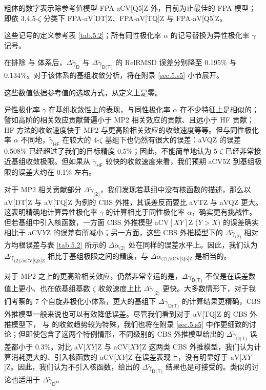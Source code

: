 \begin{table}[ht]
    \raggedright
    \par{} 粗体的数字表示除参考值模型 FPA-aCV[Q5]Z 外，目前为止最佳的 FPA 模型；即依 3,4,5-$\zeta$ 分类下 FPA-aV[DT]Z、FPA-aV[TQ]Z 与 FPA-aV[Q5]Z。
    \par{} 这些记号的定义参考表 \ref{tab.5.2}；所有同性极化率 $\alpha$ 的记号替换为异性极化率 $\gamma$ 记号。
    \par{} 在排除  与  体系后，$\Delta \tilde \gamma_\textsf{D}$ 与 $\Delta \tilde \gamma_\textsf{D(T)}$ 的 RelRMSD 误差分别降至 0.195\% 与 0.134\%。对于该体系的基组收敛分析，将在附录 \ref{sec.5.s5} 小节展开。
    \par{} 这些数值依据参考值的选取方式，从定义上是零。
\end{table}

异性极化率 $\gamma$ 在基组收敛性上的表现，与同性极化率 $\alpha$ 在不少特征上是相似的；譬如高阶的相关效应贡献普遍小于 MP2 相关效应的贡献、且远小于 HF 贡献；HF 方法的收敛速度快于 MP2 与更高阶相关效应的收敛速度等等。但与同性极化率 $\alpha$ 不同地，$\tilde \gamma_\textsf{HF}$ 在较大的 4-$\zeta$ 基组下也仍然有很大的误差：aVQZ 的误差 0.508\% 已经超过了我们的目标精度 0.5\%；因此，不能简单地认为 5-$\zeta$ 已经非常接近基组收敛极限。但如果从 $\tilde \gamma_\textsf{HF}$ 较快的收敛速度来看，我们预期 aCV5Z 到基组极限的误差大约在 0.1\% 左右。

对于 MP2 相关贡献部分 $\Delta \tilde \gamma_\textsf{(2)}$，我们发现若基组中没有核函数的描述，那么以 aV[DT]Z 与 aV[TQ]Z 为例的 CBS 外推，其误差反而要比 aVTZ 与 aVQZ 更大。这表明精确地计算异性极化率 $\gamma$ 的计算相比于同性极化率 $\alpha$，确实更有挑战性。但若基组中引入核函数，一方面 CBS 外推模型 aCV$[XY]$Z ($Y > X$) 的误差确实相比于 aCV$Y$Z 的误差有所减小；另一方面，这些 CBS 外推模型下的 $\Delta \tilde \gamma_\textsf{(2)}$ 相对方均根误差与表 \ref{tab.5.2} 所示的 $\Delta \tilde \alpha_\textsf{(2)}$ 处在同样的误差水平上。因此，我们认为 $\Delta \tilde \gamma_{\textsf{(2)}/\text{aCV[Q5]Z}}$ 相比于基组极限之间的精度，与 $\Delta \tilde \alpha_{\textsf{(2)}/\text{aCV[Q5]Z}}$ 是相当的。

对于 MP2 之上的更高阶相关效应，仍然非常幸运的是，$\Delta \tilde \gamma_\textsf{D(T)}$ 不仅是在误差数值上更小、也在依基组基数 $\zeta$ 收敛速度上比 $\Delta \tilde \gamma_\textsf{(2)}$ 更快。大多数情形下，对于我们考察的 7 个自旋非极化小体系，更大的基组下 $\Delta \tilde \gamma_\textsf{D(T)}$ 的计算结果更精确，CBS 外推模型一般来说也可以有效降低误差。尽管我们看到对于 aV[TQ]Z 的 CBS 外推模型下， 与  的收敛趋势较为特殊，我们也将在附录 \ref{sec.5.s5} 中作更细致的讨论；但即使包含了这两个特例情形，不同级别的 CBS 外推模型给出的 $\Delta \tilde \gamma_\textsf{D(T)}$ 误差都小于 0.3\%。对比 aV[$XY$]Z 与 aCV[$XY$]Z 这两类 CBS 外推模型，我们认为计算消耗更大的、引入核函数的 aCV[$XY$]Z 在误差表现上，没有明显好于 aV[$XY$]Z。因此，我们认为不引入核函数，给出的 $\Delta \tilde \gamma_\textsf{D(T)}$ 结果也是可接受的。类似的讨论也适用于 $\Delta \tilde \gamma_\textsf{D}$。

